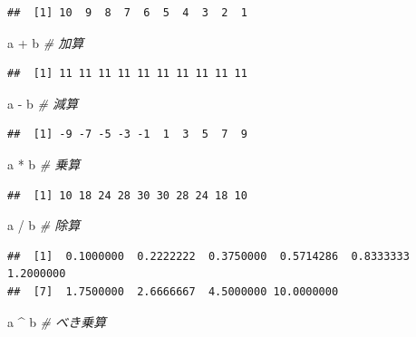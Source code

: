 \documentclass[
  12pt,
]{book}
\newenvironment{Shaded}{\begin{snugshade}}{\end{snugshade}}
\newcommand{\CommentTok}[1]{\textcolor[rgb]{0.56,0.35,0.01}{\textit{#1}}}
\newcommand{\NormalTok}[1]{#1}
\newcommand{\SpecialCharTok}[1]{\textcolor[rgb]{0.00,0.00,0.00}{#1}}
\begin{document}
\begin{verbatim}
##  [1] 10  9  8  7  6  5  4  3  2  1
\end{verbatim}

\begin{Shaded}
\begin{Highlighting}[]
\NormalTok{a }\SpecialCharTok{+}\NormalTok{ b         }\CommentTok{\# 加算}
\end{Highlighting}
\end{Shaded}

\begin{verbatim}
##  [1] 11 11 11 11 11 11 11 11 11 11
\end{verbatim}

\begin{Shaded}
\begin{Highlighting}[]
\NormalTok{a }\SpecialCharTok{{-}}\NormalTok{ b         }\CommentTok{\# 減算}
\end{Highlighting}
\end{Shaded}

\begin{verbatim}
##  [1] -9 -7 -5 -3 -1  1  3  5  7  9
\end{verbatim}

\begin{Shaded}
\begin{Highlighting}[]
\NormalTok{a }\SpecialCharTok{*}\NormalTok{ b         }\CommentTok{\# 乗算}
\end{Highlighting}
\end{Shaded}

\begin{verbatim}
##  [1] 10 18 24 28 30 30 28 24 18 10
\end{verbatim}

\begin{Shaded}
\begin{Highlighting}[]
\NormalTok{a }\SpecialCharTok{/}\NormalTok{ b         }\CommentTok{\# 除算}
\end{Highlighting}
\end{Shaded}

\begin{verbatim}
##  [1]  0.1000000  0.2222222  0.3750000  0.5714286  0.8333333  1.2000000
##  [7]  1.7500000  2.6666667  4.5000000 10.0000000
\end{verbatim}

\begin{Shaded}
\begin{Highlighting}[]
\NormalTok{a }\SpecialCharTok{\^{}}\NormalTok{ b         }\CommentTok{\# べき乗算}
\end{Highlighting}
\end{Shaded}
\end{document}
